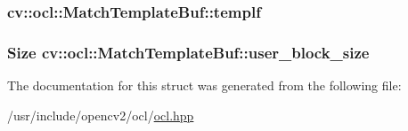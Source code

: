 \hypertarget{structcv_1_1ocl_1_1MatchTemplateBuf_a3e749d91ad8812ab00f687e35b0b7466}{
\subsubsection[{templf}]{ cv\-::ocl\-::\-Match\-Template\-Buf\-::templf}}\label{structcv_1_1ocl_1_1MatchTemplateBuf_a3e749d91ad8812ab00f687e35b0b7466}
\hypertarget{structcv_1_1ocl_1_1MatchTemplateBuf_a17e43450248311a5e8c575a8717c3bfc}{
\subsubsection[{user\-\_\-block\-\_\-size}]{\setlength{\rightskip}{0pt plus 5cm}Size cv\-::ocl\-::\-Match\-Template\-Buf\-::user\-\_\-block\-\_\-size}}\label{structcv_1_1ocl_1_1MatchTemplateBuf_a17e43450248311a5e8c575a8717c3bfc}


The documentation for this struct was generated from the following file\-:\begin{DoxyCompactItemize}
\item 
/usr/include/opencv2/ocl/\hyperlink{ocl_2ocl_8hpp}{ocl.\-hpp}\end{DoxyCompactItemize}
